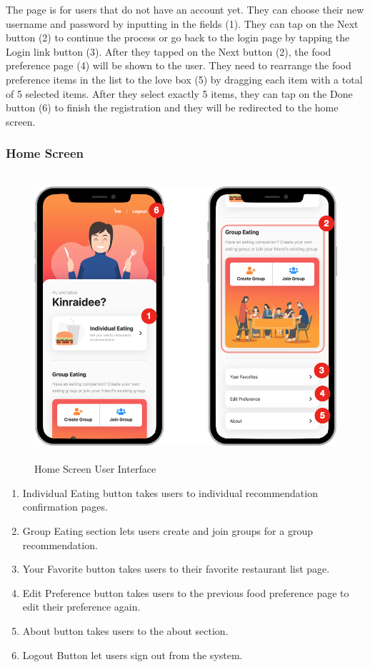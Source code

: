 \documentclass[12pt,oneside,openright,a4paper]{cpe-english-project}
\begin{document}
The page is for users that do not have an account yet. They can choose their new username and password by inputting in the fields (1). They can tap on the Next button (2) to continue the process or go back to the login page by tapping the Login link button (3). After they tapped on the Next button (2), the food preference page (4) will be shown to the user. They need to rearrange the food preference items in the list to the love box (5) by dragging each item with a total of 5 selected items. After they select exactly 5 items, they can tap on the Done button (6) to finish the registration and they will be redirected to the home screen.

\newpage
\subsubsection{Home Screen}
\begin{figure}[H]\centering
\includegraphics[height=300pt]{./images/4ui_HomeScreenUserInterface.png}
\caption{Home Screen User Interface}\label{fig:4ui_HomeScreenUserInterface}
\end{figure}\vspace{-24pt}

\begin{enumerate}
\item Individual Eating button takes users to individual recommendation confirmation pages.
\item Group Eating section lets users create and join groups for a group recommendation.
\item Your Favorite button takes users to their favorite restaurant list page.
\item Edit Preference button takes users to the previous food preference page to edit their preference again.
\item About button takes users to the about section.
\item Logout Button let users sign out from the system.
\end{enumerate}
\end{document}
